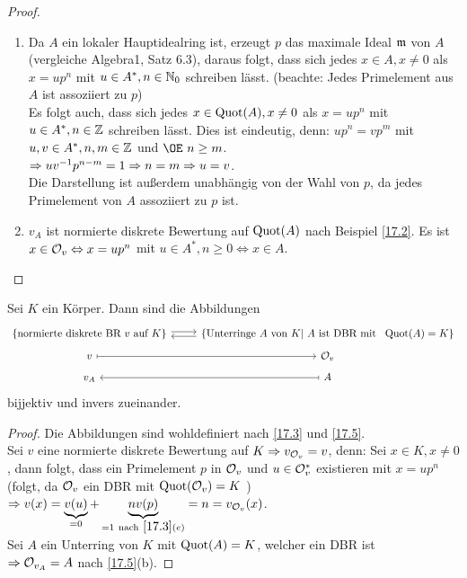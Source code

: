 \begin{proof}
	\begin{enumerate} [label= \alph*)]
		\item Da $A$ ein lokaler  Hauptidealring ist, erzeugt $p$ das maximale Ideal $\mathfrak{m}$ von $A$ (vergleiche Algebra1, Satz 6.3), daraus folgt, dass sich jedes $x \in A, x \neq 0$ als $x = up^n $ mit $ u \in A^{*}, n \in \mathbb{N}_0 $ schreiben lässt. (beachte: Jedes Primelement aus $A$ ist assoziiert zu $p$) \\
		Es folgt auch, dass sich jedes $x \in \operatorname{Quot}(A), x \neq 0 $ als $ x = up^n$ mit $ u \in A^{*}, n \in \mathbb{Z}$ schreiben lässt. Dies ist eindeutig, denn: $ up^n = vp^m $ mit $ u,v \in A^{*}, n,m \in \mathbb{Z} $ und $ \OE \ n \geq m $. \\ 
		$\Rightarrow uv^{-1}p^{n-m} = 1 \Rightarrow n=m \Rightarrow u=v$. \\
		Die Darstellung ist außerdem unabhängig von der Wahl von $p$, da jedes Primelement von $A$ assoziiert zu $p$ ist.
		\item $v_A $ ist normierte diskrete Bewertung auf $\operatorname{Quot}(A) $ nach Beispiel \ref{17.2}. Es ist $x \in \mathcal{O}_v \Leftrightarrow x = up^n $ mit $ u\in A^{*}, n \geq 0 \Leftrightarrow x \in A $.
	\end{enumerate}
\end{proof}
\begin{fo} \label{17.6}
	Sei $K$ ein Körper. Dann sind die Abbildungen 
	$$\begin{tikzcd}[row sep = tiny]
	\{\text{normierte diskrete BR} \ v \ \text{auf} \ K \} \arrow[yshift = 0.5ex]{r} & \{ \text{Unterringe} \ A \ \text{von} \ K | \ A \ \text{ist DBR mit } \ \Quot(A) = K \} \arrow[yshift = -0.5ex]{l} \\
	v \arrow[mapsto]{r}& \br \\
	v_A &  A \arrow[mapsto]{l} 
	\end{tikzcd}$$
	bijjektiv und invers zueinander.
\end{fo}
\begin{proof}
	Die Abbildungen sind wohldefiniert nach \ref{17.3} und \ref{17.5}. \\
	Sei $v$ eine normierte diskrete Bewertung auf $K \Rightarrow v_{\mathcal{O}_v} = v $, denn: Sei $x \in K, x \neq 0$, dann folgt, dass ein Primelement $p$ in $\mathcal{O}_v$ und $u \in \mathcal{O}_v^{*}$ existieren mit $ x = up^n$ (folgt, da $\mathcal{O}_v$ ein DBR mit $\operatorname{Quot}(\mathcal{O}_v) = K$ ) \\
	$\Rightarrow v(x) = \underbrace{v(u) }_{=0} +\underbrace{nv(p)}_{=1 \ \text{nach} \ \ref{17.3}(e)} = n = v_{\mathcal{O}_v}(x)$. \\
	Sei $A$ ein Unterring von $K$ mit $\operatorname{Quot}(A) = K$, welcher ein DBR ist \\
	$\Rightarrow \mathcal{O}_{v_A} =A $ nach \ref{17.5}(b).
\end{proof}

